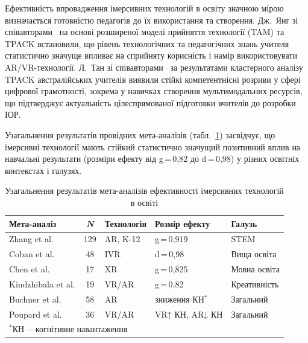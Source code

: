 Ефективність впровадження імерсивних технологій в освіту значною мірою визначається готовністю педагогів до їх використання та створення. Дж.~Янг зі співавторами~\cite{Jang2021TAM} на основі розширеної моделі прийняття технології (TAM) та TPACK встановили, що рівень технологічних та педагогічних знань учителя статистично значуще впливає на сприйняту корисність і намір використовувати AR/VR-технології. Л.~Тан зі співавторами~\cite{Tan2023TPACK} за результатами кластерного аналізу TPACK австралійських учителів виявили стійкі компетентнісні розриви у сфері цифрової грамотності, зокрема у навичках створення мультимодальних ресурсів, що підтверджує актуальність цілеспрямованої підготовки вчителів до розробки ІОР.

Узагальнення результатів провідних мета-аналізів (табл.~\ref{tab:meta_analysis}) засвідчує, що імерсивні технології мають стійкий статистично значущий позитивний вплив на навчальні результати (розміри ефекту від g\,=\,0{,}82 до d\,=\,0{,}98) у різних освітніх контекстах і галузях.

\begin{table}[!h]
\centering
\caption{Узагальнення результатів мета-аналізів ефективності імерсивних технологій в освіті}
\label{tab:meta_analysis}
\small
\begin{tabular}{|l|c|l|l|l|}
\hline
\hfill \textbf{Мета-аналіз} & \textbf{\textit{N}} & \textbf{Технологія} & \hfill \textbf{Розмір ефекту} & \hfill \textbf{Галузь} \\
\hline
Zhang et al. \cite{Omelchuk2024Secondary} & 129 & AR, K-12 & g\,=\,0{,}919 & STEM \\
\hline
Coban et al. \cite{Lytvynova2023Comparative} & 48 & IVR & d\,=\,0{,}98 & Вища освіта \\
\hline
Chen et al. \cite{Boiko2024Immersive} & 17 & XR & g\,=\,0{,}825 & Мовна освіта \\
\hline
Kindzhibala et al. \cite{Kindzhibala2025Creative} & 19 & VR/AR & g\,=\,0{,}82 & Креативність \\
\hline
Buchner et al. \cite{Buchner2021CogLoad} & 58 & AR & зниження КН$^{*}$ & Загальний \\
\hline
Poupard et al. \cite{Poupard2024Systematic} & 36 & VR/AR & VR↑ КН, AR↓ КН & Загальний \\
\hline
\multicolumn{5}{l}{\footnotesize $^{*}$КН~-- когнітивне навантаження} \\
\end{tabular}
\end{table}

